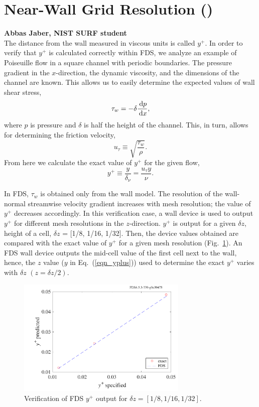 \documentclass[11pt]{book}
\begin{document}
\section{Near-Wall Grid Resolution (\texorpdfstring{}{yplus})}

\textbf{Abbas Jaber, NIST SURF student}\\

\noindent The distance from the wall measured in viscous units is called $y^+$. In order to verify that $y^+$ is calculated correctly within FDS, we analyze an example of Poiseuille flow in a square channel with periodic boundaries. The pressure gradient in the $x$-direction, the dynamic viscosity, and the dimensions of the channel are known. This allows us to easily determine the expected values of wall shear stress,
\begin{equation}
\label{wall stress}
\tau_w = - \delta \frac{\,\mathrm{d} p}{\,\mathrm{d} x},
\end{equation}
where $p$ is pressure and $\delta$ is half the height of the channel. This, in turn, allows for determining the friction velocity,
\begin{equation}
\label{friction velocity}
u_{\tau} \equiv \sqrt{{\frac{\tau_w}{\rho}}}.
\end{equation}
From here we calculate the exact value of $y^+$ for the given flow,
\begin{equation}
\label{eqn_yplus}
y^+ \equiv \frac{y}{\delta_{\nu}} = \frac{u_{\tau}y}{\nu}.
\end{equation}

In FDS, $\tau_w$ is obtained only from the wall model. The resolution of the wall-normal streamwise velocity gradient increases with  mesh resolution; the value of $y^+$ decreases accordingly. In this verification case, a wall device is used to output $y^+$ for different mesh resolutions in the $z$-direction. $y^+$ is output for a given $\delta z$, height of a cell, $\delta z$ = [1/8, 1/16, 1/32]. Then, the device values obtained are compared with the exact value of $y^+$ for a given mesh resolution (Fig.~\ref{fig_yplus}). An FDS wall device outputs the mid-cell value of the first cell next to the wall, hence, the $z$ value ($y$ in Eq.~(\ref{eqn_yplus})) used to determine the exact $y^+$ varies with $\delta z$ $(z = \delta z/2)$.

\begin{figure}[ht]
\centering
\includegraphics[width=3.2in]{SCRIPT_FIGURES/yplus}
\caption[Near-wall grid resolution]{Verification of FDS $y^+$ output for $\delta z=[1/8, 1/16, 1/32]$.}
\label{fig_yplus}
\end{figure}
\end{document}
